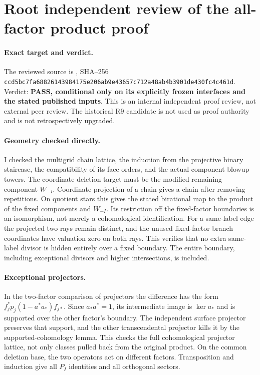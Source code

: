 \section{Root independent review of the all-factor product proof}
\label{r20audit:DProot}

\paragraph{Exact target and verdict.}
The reviewed source is
,
SHA--256
\texttt{ccd5bc7fa68826143984175e206ab9e43657c712a48ab4b3901de430fc4c461d}.
Verdict: \textbf{PASS, conditional only on its explicitly frozen interfaces
and the stated published inputs}. This is an internal independent proof
review, not external peer review. The historical R9 candidate is not used
as proof authority and is not retrospectively upgraded.

\paragraph{Geometry checked directly.}
I checked the multigrid chain lattice, the induction from the projective
binary staircase, the compatibility of its face orders, and the actual
component blowup towers. The coordinate deletion target must be the
modified remaining component $W_{-I}$. Coordinate projection of a chain
gives a chain after removing repetitions. On quotient stars this gives
the stated birational map to the product of the fixed components and
$W_{-I}$. Its restriction off the fixed-factor boundaries is an
isomorphism, not merely a cohomological identification.
For a same-label edge the projected two rays remain distinct, and the
unused fixed-factor branch coordinates have valuation zero on both
rays. This verifies that no extra same-label divisor is hidden entirely
over a fixed boundary. The entire boundary, including exceptional
divisors and higher intersections, is included.

\paragraph{Exceptional projectors.}
In the two-factor comparison of projectors the difference has the form
$f_j^*p_j(1-a^*a_*)f_{j*}$. Since $a_*a^*=1$, its intermediate image is
$\ker a_*$ and is supported over the other factor's boundary. The
independent surface projector preserves that support, and the other
transcendental projector kills it by the supported-cohomology lemma.
This checks the full cohomological projector lattice, not only classes
pulled back from the original product. On the common deletion base,
the two operators act on different factors. Transposition and induction
give all $P_I$ identities and all orthogonal sectors.

